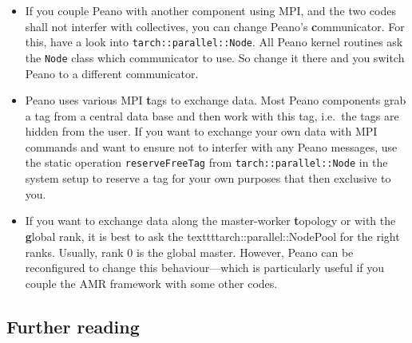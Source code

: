 \begin{itemize}
  \item If you couple Peano with another component using MPI, and the two codes
  shall not interfer with collectives, you can change Peano's {\textbf
  communicator}.
  For this, have a look into \texttt{tarch::parallel::Node}. All Peano kernel
  routines ask the \texttt{Node} class which communicator to use. So change it
  there and you switch Peano to a different communicator.
  \item Peano uses various MPI {\textbf tags} to exchange data. Most Peano
  components grab a tag from a central data base and then work with this tag,
  i.e.~the tags are hidden from the user. If you want to exchange your own data
  with MPI commands and want to ensure not to interfer with any Peano messages,
  use the static operation \texttt{reserveFreeTag} from \linebreak
  \texttt{tarch::parallel::Node} in the system setup to reserve a tag for your
  own purposes that then exclusive to you.
  \item If you want to exchange data along the master-worker {\textbf topology} or
  with the {\textbf global rank}, it is best to ask the
  texttt{tarch::parallel::NodePool} for the right ranks. Usually, rank 0 is the
  global master. However, Peano can be reconfigured to change this
  behaviour---which is particularly useful if you couple the AMR framework with
  some other codes.
\end{itemize}



\subsection*{Further reading}

